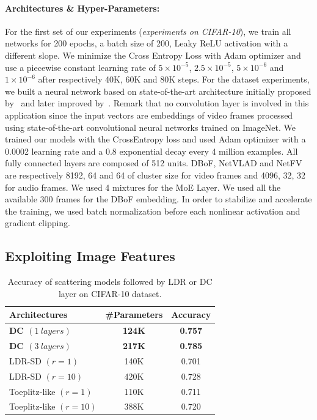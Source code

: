 \paragraph{Architectures \& Hyper-Parameters:} 
For the first set of our experiments (\emph{experiments on CIFAR-10}), we train all networks for 200 epochs, a batch size of 200, Leaky ReLU activation with a different slope.
We minimize the Cross Entropy Loss with Adam optimizer and use a piecewise constant learning rate of $5 \times 10^{-5}$, $2.5\times10^{-5}$, $5\times10^{-6}$ and $1\times10^{-6}$ after respectively 40K, 60K and 80K steps.
For the \yt dataset experiments, we built a neural network based on state-of-the-art architecture initially proposed by~\citet{abu2016youtube} and later improved by~\citet{miech2017learnable}.
Remark that no convolution layer is involved in this application since the input vectors are embeddings of video frames processed using state-of-the-art convolutional neural networks trained on ImageNet.
We trained our models with the CrossEntropy loss and used Adam optimizer with a 0.0002 learning rate and a 0.8 exponential decay every 4 million examples.
All fully connected layers are composed of 512 units.
DBoF, NetVLAD and NetFV are respectively 8192, 64 and 64 of cluster size for video frames and 4096, 32, 32 for audio frames.
We used 4 mixtures for the MoE Layer.
We used all the available 300 frames for the DBoF embedding.
In order to stabilize and accelerate the training, we used batch normalization before each nonlinear activation and gradient clipping. 


\subsection{Exploiting Image Features}

\begin{table}[htb]
  \centering
  \begin{tabular}{lcc}
    \toprule
    \textbf{Architectures} & \textbf{\#Parameters} & \textbf{Accuracy}  \\
    \midrule
    \textbf{DC $(1\ layers)$} & \textbf{124K} & \textbf{0.757} \\
    \textbf{DC $(3\ layers)$} & \textbf{217K} & \textbf{0.785} \\
    LDR-SD $(r=1)$ & 140K & 0.701 \\
    LDR-SD $(r=10)$ & 420K & 0.728 \\
    Toeplitz-like $(r=1)$ & 110K & 0.711 \\
    Toeplitz-like $(r=10)$ & 388K & 0.720 \\
    \bottomrule
    \end{tabular}
    \caption{Accuracy of scattering models followed by LDR or DC layer on CIFAR-10 dataset.}
    \label{table:ch4-xp_ldr_scattering}
\end{table}




